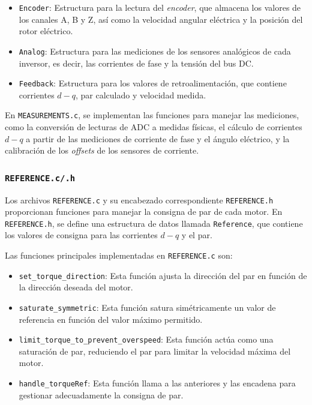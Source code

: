 \begin{itemize}
	\item \texttt{Encoder}: Estructura para la lectura del \textit{encoder}, que almacena los valores de los canales A, B y Z, así como la velocidad angular eléctrica y la posición del rotor eléctrico.
	\item \texttt{Analog}: Estructura para las mediciones de los sensores analógicos de cada inversor, es decir, las corrientes de fase y la tensión del bus DC.
	\item \texttt{Feedback}: Estructura para los valores de retroalimentación, que contiene corrientes $d-q$, par calculado y velocidad medida.
\end{itemize}

En \texttt{MEASUREMENTS.c}, se implementan las funciones para manejar las mediciones, como la conversión de lecturas de ADC a medidas físicas, el cálculo de corrientes $d-q$ a partir de las mediciones de corriente de fase y el ángulo eléctrico, y la calibración de los \textit{offsets} de los sensores de corriente.

\subsubsection{\texttt{REFERENCE.c/.h}}

Los archivos \texttt{REFERENCE.c} y su encabezado correspondiente \texttt{REFERENCE.h} proporcionan funciones para manejar la consigna de par de cada motor. En \texttt{REFERENCE.h}, se define una estructura de datos llamada \texttt{Reference}, que contiene los valores de consigna para las corrientes $d-q$ y el par. 

Las funciones principales implementadas en \texttt{REFERENCE.c} son:

\begin{itemize}
	\item \texttt{set\_torque\_direction}: Esta función ajusta la dirección del par en función de la dirección deseada del motor.
	\item \texttt{saturate\_symmetric}: Esta función satura simétricamente un valor de referencia en función del valor máximo permitido.
	\item \texttt{limit\_torque\_to\_prevent\_overspeed}: Esta función actúa como una saturación de par, reduciendo el par para limitar la velocidad máxima del motor.
	
	\item \texttt{handle\_torqueRef}: Esta función llama a las anteriores y las encadena para gestionar adecuadamente la consigna de par.
	
\end{itemize}

